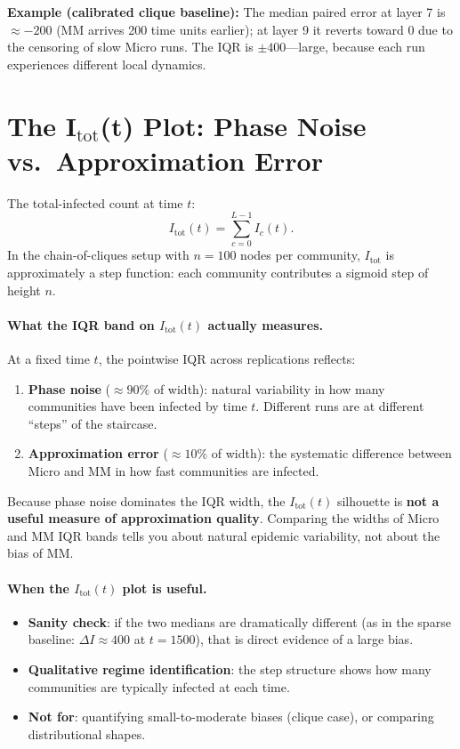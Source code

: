 \documentclass[11pt,a4paper]{article}
\begin{document}
\textbf{Example (calibrated clique baseline):}
The median paired error at layer 7 is $\approx -200$ (MM arrives
200 time units earlier); at layer 9 it reverts toward 0 due to
the censoring of slow Micro runs.  The IQR is $\pm 400$---large, because
each run experiences different local dynamics.

\section{The I\texorpdfstring{$_{\mathrm{tot}}$}{tot}(t) Plot: Phase Noise vs.\ Approximation Error}
\label{sec:itot}

The total-infected count at time $t$:
\[
  I_{\mathrm{tot}}(t) = \sum_{c=0}^{L-1} I_c(t).
\]
In the chain-of-cliques setup with $n=100$ nodes per community, $I_{\mathrm{tot}}$
is approximately a step function: each community contributes a sigmoid step
of height $n$.

\paragraph{What the IQR band on $I_{\mathrm{tot}}(t)$ actually measures.}
At a fixed time $t$, the pointwise IQR across replications reflects:
\begin{enumerate}
  \item \textbf{Phase noise} ($\approx 90\%$ of width): natural variability
        in how many communities have been infected by time $t$.
        Different runs are at different ``steps'' of the staircase.
  \item \textbf{Approximation error} ($\approx 10\%$ of width): the systematic
        difference between Micro and MM in how fast communities are infected.
\end{enumerate}

Because phase noise dominates the IQR width, the $I_{\mathrm{tot}}(t)$ silhouette is
\textbf{not a useful measure of approximation quality}.  Comparing the widths of
Micro and MM IQR bands tells you about natural epidemic variability, not about
the bias of MM.

\paragraph{When the $I_{\mathrm{tot}}(t)$ plot is useful.}
\begin{itemize}
  \item \textbf{Sanity check}: if the two medians are dramatically different
        (as in the sparse baseline: $\Delta I \approx 400$ at $t=1500$),
        that is direct evidence of a large bias.
  \item \textbf{Qualitative regime identification}: the step structure shows
        how many communities are typically infected at each time.
  \item \textbf{Not for}: quantifying small-to-moderate biases (clique case),
        or comparing distributional shapes.
\end{itemize}
\end{document}
